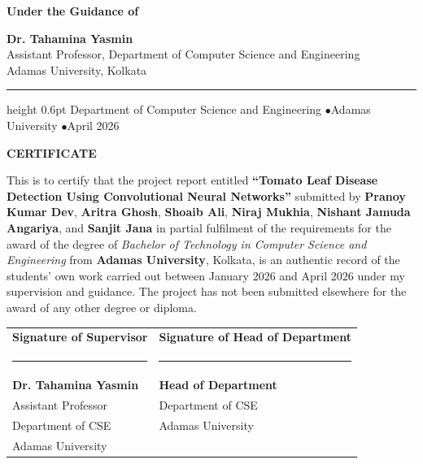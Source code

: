 \documentclass[12pt,a4paper]{report}
\begin{document}
\begin{titlepage}
\begin{center}
\vspace{18pt}

{\large\textbf{Under the Guidance of}}

\vspace{8pt}
{\large\textbf{Dr. Tahamina Yasmin}}\\[3pt]
{\normalsize Assistant Professor, Department of Computer Science and Engineering}\\[2pt]
{\normalsize Adamas University, Kolkata}

\vfill

\hrule height 0.6pt
\vspace{8pt}
{\normalsize Department of Computer Science and Engineering \enspace$\bullet$\enspace Adamas University \enspace$\bullet$\enspace April 2026}

\end{center}
\end{titlepage}

\clearpage
\thispagestyle{plain}
\begin{center}
  {\Large\textbf{CERTIFICATE}}
\end{center}
\vspace{16pt}

\noindent This is to certify that the project report entitled \textbf{``Tomato Leaf Disease Detection Using Convolutional Neural Networks''} submitted by \textbf{Pranoy Kumar Dev}, \textbf{Aritra Ghosh}, \textbf{Shoaib Ali}, \textbf{Niraj Mukhia}, \textbf{Nishant Jamuda Angariya}, and \textbf{Sanjit Jana} in partial fulfilment of the requirements for the award of the degree of \textit{Bachelor of Technology in Computer Science and Engineering} from \textbf{Adamas University}, Kolkata, is an authentic record of the students' own work carried out between January 2026 and April 2026 under my supervision and guidance. The project has not been submitted elsewhere for the award of any other degree or diploma.

\vspace{36pt}

\noindent\begin{tabular}{p{7.5cm}p{6cm}}
  \textbf{Signature of Supervisor} & \textbf{Signature of Head of Department} \\[28pt]
  \rule{5.5cm}{0.4pt} & \rule{5.5cm}{0.4pt}\\[4pt]
  \textbf{Dr. Tahamina Yasmin} & \textbf{Head of Department}\\
  Assistant Professor & Department of CSE\\
  Department of CSE & Adamas University\\
  Adamas University & \\
\end{tabular}
\end{document}

